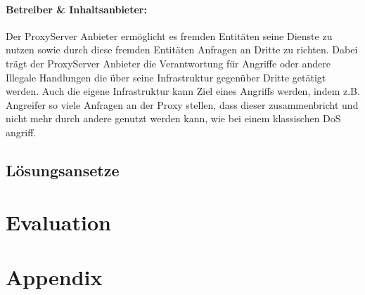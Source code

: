 \documentclass[12pt, a4paper]{scrartcl}
\begin{document}
\paragraph{Betreiber \& Inhaltsanbieter:}
Der ProxyServer Anbieter ermöglicht es fremden Entitäten seine Dienste zu nutzen sowie durch diese fremden Entitäten Anfragen an Dritte zu richten. Dabei trägt der ProxyServer Anbieter die Verantwortung für Angriffe oder andere Illegale Handlungen die über seine Infrastruktur gegenüber Dritte getätigt werden.\newline
Auch die eigene Infrastruktur kann Ziel eines Angriffs werden, indem z.B. Angreifer so viele Anfragen an der Proxy stellen, dass dieser zusammenbricht und nicht mehr durch andere genutzt werden kann, wie bei einem klassischen \ac{DoS} angriff.
\subsection{Lösungsansetze}
\section{Evaluation}


\newpage
\renewcommand{\thesubsection}{\Alph{subsection}}
\setcounter{page}{\value{lastroman}}
\section*{Appendix}

\end{document}
